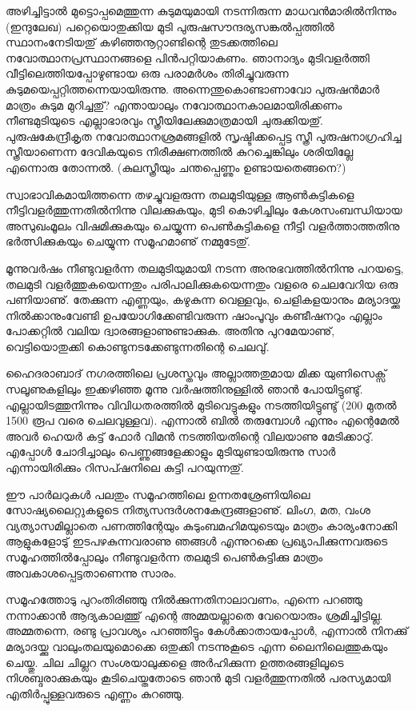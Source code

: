 അഴിച്ചിട്ടാല്‍ മുട്ടൊപ്പമെത്തുന്ന കുടുമയുമായി നടന്നിരുന്ന മാധവന്‍മാരില്‍നിന്നും (ഇന്ദുലേഖ) 
പറ്റെയൊതുക്കിയ മുടി പുരുഷസൗന്ദര്യസങ്കല്‍പ്പത്തില്‍ സ്ഥാനംനേടിയതു് കഴിഞ്ഞനൂറ്റാണ്ടിന്റെ തുടക്കത്തിലെ 
നവോത്ഥാനപ്രസ്ഥാനങ്ങളെ പിന്‍പറ്റിയാകണം. ഞാനാദ്യം മുടിവളര്‍ത്തി വീട്ടിലെത്തിയപ്പോഴുണ്ടായ ഒരു പരാമര്‍ശം തിരിച്ചുവരുന്ന കുടുമയെപ്പറ്റിത്തന്നെയായിരുന്നു. അന്നെന്തുകൊണ്ടാണാവോ പുരുഷന്‍മാര്‍ മാത്രം കുടുമ മുറിച്ചതു്? എന്തായാലും 
നവോത്ഥാനകാലമായിരിക്കണം നീണ്ടമുടിയുടെ എല്ലാഭാരവും സ്ത്രീയിലേക്കുമാത്രമായി ചുരുക്കിയതു്.  
പുരുഷകേന്ദ്രീകൃത നവോത്ഥാനശ്രമങ്ങളില്‍ സൃഷ്ടിക്കപ്പെട്ട സ്ത്രീ പുരുഷനാഗ്രഹിച്ച സ്ത്രീയാണെന്ന ദേവികയുടെ നിരീക്ഷണത്തില്‍ 
കുറച്ചെങ്കിലും ശരിയില്ലേ എന്നൊരു തോന്നല്‍. (കുലസ്ത്രീയും ചന്തപ്പെണ്ണും ഉണ്ടായതെങ്ങനെ?)

സ്വാഭാവികമായിത്തന്നെ തഴച്ചുവളരുന്ന തലമുടിയുള്ള ആണ്‍കുട്ടികളെ നീട്ടിവളര്‍ത്തുന്നതില്‍നിന്നു വിലക്കുകയും, മുടി 
കൊഴിച്ചിലും കേശസംബന്ധിയായ അസുഖംമൂലം വിഷമിക്കുകയും ചെയ്യുന്ന പെണ്‍കുട്ടികളെ നീട്ടി വളര്‍ത്താത്തതിനു 
ഭര്‍ത്സിക്കുകയും ചെയ്യുന്ന സമൂഹമാണു് നമ്മുടേതു്.

മൂന്നുവര്‍ഷം നീണ്ടുവളര്‍ന്ന തലമുടിയുമായി നടന്ന അനുഭവത്തില്‍നിന്നു പറയട്ടെ, തലമുടി വളര്‍ത്തുകയെന്നതും 
പരിപാലിക്കുകയെന്നതും വളരെ ചെലവേറിയ ഒരു പണിയാണു്. തേക്കുന്ന എണ്ണയും, കഴുകുന്ന വെള്ളവും, ചെളികളയാനും 
മര്യാദയ്ക്കു നില്‍ക്കാനുംവേണ്ടി ഉപയോഗിക്കേണ്ടിവരുന്ന ഷാംപൂവും കണ്ടീഷനറും എല്ലാം പോക്കറ്റില്‍ വലിയ 
ദ്വാരങ്ങളാണുണ്ടാക്കുക. അതിനു പുറമേയാണു്, വെട്ടിയൊതുക്കി കൊണ്ടുനടക്കേണ്ടുന്നതിന്റെ ചെലവു്.

ഹൈദരാബാദ് നഗരത്തിലെ പ്രശസ്തവും അല്ലാത്തതുമായ മിക്ക യുണിസെക്സ് സലൂണുകളിലും ഇക്കഴിഞ്ഞ മൂന്നു 
വര്‍ഷത്തിനുള്ളില്‍ ഞാന്‍ പോയിട്ടുണ്ടു്. എല്ലായിടത്തുനിന്നും വിവിധതരത്തില്‍ മുടിവെട്ടുകളും നടത്തിയിട്ടുണ്ടു് (200 
‌മുതല്‍ 1500 രൂപ വരെ ചെലവുള്ളവ). എന്നാല്‍ ബില്‍ തരുമ്പോള്‍ എന്നും എന്റെമേല്‍ അവര്‍ ഹെയര്‍ കട്ട് ഫോര്‍ 
വിമന്‍ നടത്തിയതിന്റെ വിലയാണു മേടിക്കാറു്. എപ്പോള്‍ ചോദിച്ചാലും പെണ്ണുങ്ങളേക്കാളും മുടിയുണ്ടായിരുന്നു സാര്‍ 
എന്നായിരിക്കും റിസപ്ഷനിലെ കുട്ടി പറയുന്നതു്.

ഈ പാര്‍ലറുകള്‍ പലതും സമൂഹത്തിലെ ഉന്നതശ്രേണിയിലെ സോഷ്യലൈറ്റുകളുടെ നിത്യസന്ദര്‍ശനകേന്ദ്രങ്ങളാണു്. 
ലിംഗ, മത, വംശ വ്യത്യാസമില്ലാതെ പണത്തിന്റേയും കുടുംബമഹിമയുടെയും മാത്രം കാര്യംനോക്കി ആളുകളോടു് 
ഇടപഴകുന്നവരാണു ഞങ്ങള്‍ എന്നുറക്കെ പ്രഖ്യാപിക്കുന്നവരുടെ സമൂഹത്തില്‍പ്പോലും നീണ്ടുവളര്‍ന്ന തലമുടി പെണ്‍കുട്ടിക്കു 
മാത്രം അവകാശപ്പെട്ടതാണെന്നു സാരം.

സമൂഹത്തോടു പുറംതിരിഞ്ഞു നില്‍ക്കുന്നതിനാലാവണം, എന്നെ പറഞ്ഞു നന്നാക്കാന്‍ ആദ്യകാലത്തു് എന്റെ 
അമ്മയല്ലാതെ വേറെയാരും ശ്രമിച്ചിട്ടില്ല. അമ്മതന്നെ, രണ്ടു പ്രാവശ്യം പറഞ്ഞിട്ടും കേള്‍ക്കാതായപ്പോള്‍, എന്നാല്‍ 
നിനക്കു് മര്യാദയ്ക്കു വാലുംതലയുമൊക്കെ ഒതുക്കി നടന്നുകൂടെ എന്ന ലൈനിലെത്തുകയും ചെയ്തു. ചില ചില്ലറ 
സംശയാലുക്കളെ അര്‍ഹിക്കുന്ന ഉത്തരങ്ങളിലൂടെ നിശബ്ദരാക്കുകയും കൂടിചെയ്തതോടെ ഞാന്‍ മുടി വളര്‍ത്തുന്നതില്‍ 
പരസ്യമായി എതിര്‍പ്പുള്ളവരുടെ എണ്ണം കുറഞ്ഞു.

